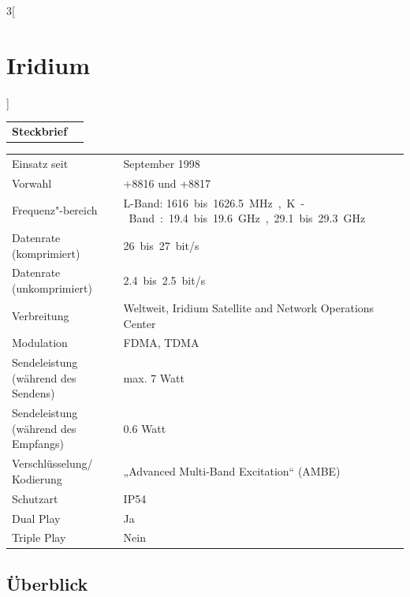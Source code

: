 \begin{multicols}{3}[\section{Iridium}]


\newrefsegment

\begin{tabular}{p{}p{2.7 cm}}
\textbf{Steckbrief}& \\
\end{tabular}
\begin{tabular}{p{}p{2.7 cm}}
      Einsatz seit & September 1998\\
      Vorwahl & +8816 und +8817\\
      Frequenz"-bereich  & L-Band:
      \SI{1616}bis\SI{1626.5}{\mega\hertz}, 
      K-Band: \SI{19.4} bis\SI{19.6} {\giga\hertz}, \SI{29.1} bis \SI{29.3} {\giga\hertz}\\
      Datenrate (komprimiert) & \SI{26} bis \SI{27} {bit/s}\\
      Datenrate (unkomprimiert) & \SI{2.4} bis \SI{2.5} {bit/s}\\
      Verbreitung & Weltweit, Iridium Satellite and Network Operations Center \\
      Modulation & FDMA, TDMA\\
      Sendeleistung (während des Sendens) & max. 7 Watt\\
      Sendeleistung (während des Empfangs) & 0.6 Watt\\
      Verschlüsselung/ Kodierung & „Advanced Multi-Band Excitation“ (AMBE)\\
      Schutzart & IP54\\
      Dual Play & Ja\\
      Triple Play & Nein\\
\end{tabular}
\par
\subsection*{Überblick}


\end{multicols}
